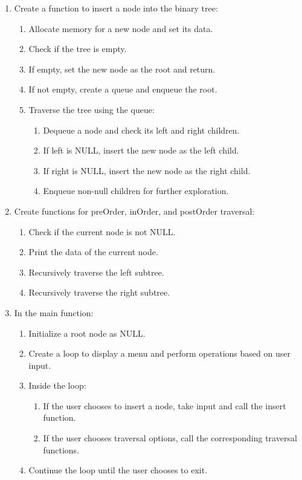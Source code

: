 \begin{enumerate}[label=\arabic*.]
    \item Create a function to insert a node into the binary tree:
    \begin{enumerate}[label=\arabic{enumi}.\arabic*.]
        \item Allocate memory for a new node and set its data.
        \item Check if the tree is empty.
        \item If empty, set the new node as the root and return.
        \item If not empty, create a queue and enqueue the root.
        \item Traverse the tree using the queue:
        \begin{enumerate}[label=\arabic{enumi}.\arabic{enumii}.\arabic*.]
            \item Dequeue a node and check its left and right children.
            \item If left is NULL, insert the new node as the left child.
            \item If right is NULL, insert the new node as the right child.
            \item Enqueue non-null children for further exploration.
        \end{enumerate}
    \end{enumerate}
    
    \item Create functions for preOrder, inOrder, and postOrder traversal:
    \begin{enumerate}[label=\arabic{enumi}.\arabic*.]
        \item Check if the current node is not NULL.
        \item Print the data of the current node.
        \item Recursively traverse the left subtree.
        \item Recursively traverse the right subtree.
    \end{enumerate}
    
    \item In the main function:
    \begin{enumerate}[label=\arabic{enumi}.\arabic*.]
        \item Initialize a root node as NULL.
        \item Create a loop to display a menu and perform operations based on user input.
        \item Inside the loop:
        \begin{enumerate}[label=\arabic{enumi}.\arabic{enumii}.\arabic*.]
            \item If the user chooses to insert a node, take input and call the insert function.
            \item If the user chooses traversal options, call the corresponding traversal functions.
        \end{enumerate}
        \item Continue the loop until the user chooses to exit.
    \end{enumerate}
    

\end{enumerate}
